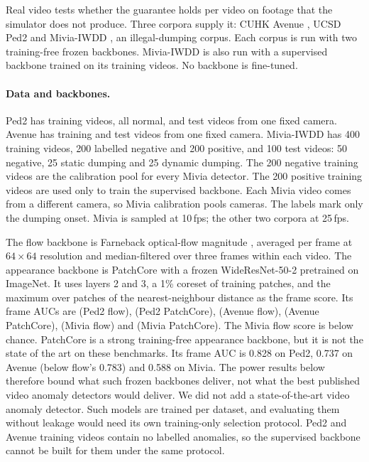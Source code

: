 Real video tests whether the guarantee holds per video on footage that the
simulator does not produce. Three corpora supply it: CUHK Avenue
\citep{lu2013avenue}, UCSD Ped2 \citep{mahadevan2010ucsd} and Mivia-IWDD
\citep{greco2026iwdd}, an illegal-dumping corpus. Each corpus is run with two
training-free frozen backbones. Mivia-IWDD is also run with a supervised backbone
trained on its training videos. No backbone is fine-tuned.

\paragraph{Data and backbones.} Ped2 has \RealPedTwoNTrainVideos{} training
videos, all normal, and \RealPedTwoNTestVideos{} test videos from one fixed
camera. Avenue has \RealAvenueNTrainVideos{} training and
\RealAvenueNTestVideos{} test videos from one fixed camera. Mivia-IWDD has 400
training videos, 200 labelled negative and 200 positive, and 100 test videos: 50
negative, 25 static dumping and 25 dynamic dumping. The 200 negative training
videos are the calibration pool for every Mivia detector. The 200 positive
training videos are used only to train the supervised backbone. Each Mivia video
comes from a different camera, so Mivia calibration pools cameras. The labels
mark only the dumping onset. Mivia is sampled at 10\,fps; the other two corpora at
25\,fps.

The flow backbone is Farneback optical-flow magnitude \citep{farneback2003},
averaged per frame at $64\times64$ resolution and median-filtered over three
frames within each video. The appearance backbone is PatchCore
\citep{roth2022total} with a frozen WideResNet-50-2 pretrained on ImageNet.
It uses layers 2 and 3, a 1\% coreset of training patches, and the maximum
over patches of the nearest-neighbour distance as the frame score. Its frame
AUCs are \RThreePedTwoFlowAuc{} (Ped2 flow), \RThreePedTwoPCAuc{} (Ped2 PatchCore),
\RThreeAvenueFlowAuc{} (Avenue flow), \RThreeAvenuePCAuc{} (Avenue PatchCore),
\RThreeMiviaFlowAuc{} (Mivia flow) and \RThreeMiviaPCAuc{} (Mivia PatchCore).
The Mivia flow score is below chance. PatchCore is a strong training-free
appearance backbone, but it is not the state of the art on these benchmarks. Its
frame AUC is 0.828 on Ped2, 0.737 on Avenue (below flow's 0.783) and 0.588 on
Mivia. The power results below therefore bound what such frozen backbones
deliver, not what the best published video anomaly detectors would deliver. We
did not add a state-of-the-art video anomaly detector. Such models are trained per
dataset, and evaluating them without leakage would need its own training-only
selection protocol. Ped2 and Avenue training videos contain no labelled anomalies,
so the supervised backbone cannot be built for them under the same protocol.

